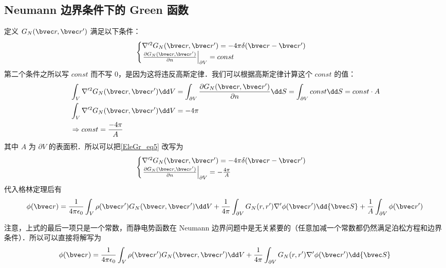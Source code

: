 \subsection{Neumann 边界条件下的 Green 函数}
定义 $G_N(\bvec r,\bvec r')$ 满足以下条件：
\begin{equation}\label{EleGr_eq5}
\begin{cases}
\nabla'^2G_N(\bvec r,\bvec r')=-4\pi\delta(\bvec r-\bvec r')\\
\left.\frac{\partial G_N(\bvec r,\bvec r')}{\partial n}\right|_{\partial V}=const
\end{cases}
\end{equation}
第二个条件之所以写 $const$ 而不写 $0$，是因为这将违反高斯定律．我们可以根据高斯定律计算这个 $const$ 的值：
\begin{equation}
\begin{aligned}
&\int_V \nabla'^2 G_N(\bvec r,\bvec r')\dd V=\int_{\partial V}\frac{\partial G_N(\bvec r,\bvec r')}{\partial n}\dd S=\int_{\partial V}const \dd S=const\cdot A\\
&\int_V \nabla'^2 G_N(\bvec r,\bvec r')\dd V=-4\pi\\
&\Rightarrow const=\frac{-4\pi}{A}
\end{aligned}
\end{equation}
其中 $A$ 为 $\partial V$ 的表面积．所以可以把\autoref{EleGr_eq5} 改写为
\begin{equation}
\begin{cases}
\nabla'^2G_N(\bvec r,\bvec r')=-4\pi\delta(\bvec r-\bvec r')\\
\left.\frac{\partial G_N(\bvec r,\bvec r')}{\partial n}\right|_{\partial V}=-\frac{4\pi}{A}
\end{cases}
\end{equation}
代入格林定理后有
\begin{equation}
\phi(\bvec r)=\frac{1}{4\pi\epsilon_0}\int_V \rho(\bvec r')G_N(\bvec r,\bvec r')\dd V+\frac{1}{4\pi}\int_{\partial V} G_N(r,r')\nabla'\phi(\bvec r')\dd {\bvec S}+\frac{1}{A}\int_{\partial V}\phi(\bvec r')
\end{equation}

注意，上式的最后一项只是一个常数，而静电势函数在 Neumann 边界问题中是无关紧要的（任意加减一个常数都仍然满足泊松方程和边界条件）．所以可以直接将解写为
\begin{equation}
\phi(\bvec r)=\frac{1}{4\pi\epsilon_0}\int_V \rho(\bvec r')G_N(\bvec r,\bvec r')\dd V+\frac{1}{4\pi}\int_{\partial V} G_N(r,r')\nabla'\phi(\bvec r')\dd {\bvec S}
\end{equation}
